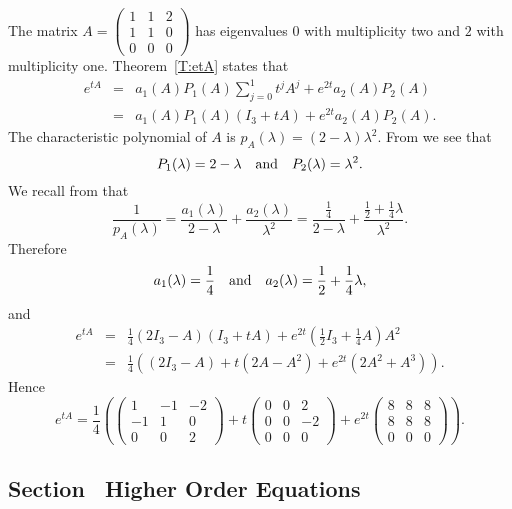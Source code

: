 \documentclass{ximera}
\begin{document}
\soln The matrix 
$A = \left(\begin{array}{rrr} 1 & 1 & 2\\ 1 & 1 & 0 \\ 0 & 0 & 0
\end{array}\right)$ has eigenvalues $0$ with multiplicity two and $2$ 
with multiplicity one. Theorem~\ref{T:etA} states that 
\begin{eqnarray*}
e^{tA} & = & a_1(A)P_1(A)\sum_{j=0}^1t^jA^j + e^{2t}a_2(A)P_2(A)\\
 & = & a_1(A)P_1(A)(I_3+tA) + e^{2t}a_2(A)P_2(A).
\end{eqnarray*}
The characteristic polynomial of $A$ is $p_A(\lambda) =(2-\lambda)\lambda^2$.
From  we see that
\[
P_1(\lambda) = 2-\lambda \quad\mbox{and}\quad P_2(\lambda) = \lambda^2.
\]
We recall from  that 
\[
\frac{1}{p_A(\lambda)} = \frac{a_1(\lambda)}{2-\lambda} + 
\frac{a_2(\lambda)}{\lambda^2} = \frac{\frac{1}{4}}{2-\lambda}
+ \frac{\frac{1}{2}+\frac{1}{4}\lambda}{\lambda^2}.
\]
Therefore
\[
a_1(\lambda) = \frac{1}{4} \quad\mbox{and}\quad a_2(\lambda) = \frac{1}{2}+\frac{1}{4}\lambda,
\]
and
\begin{eqnarray*}
e^{tA} & = & \frac{1}{4}(2I_3-A)(I_3+tA) + 
e^{2t}\left(\frac{1}{2}I_3+\frac{1}{4}A\right)A^2\\
& = & \frac{1}{4}\left((2I_3-A)+t(2A-A^2)+e^{2t}(2A^2+A^3)\right).
\end{eqnarray*}
Hence
\[
e^{tA}= \frac{1}{4}\left(\left(\begin{array}{rrr} 1 & -1 & -2\\ -1 & 1 & 0 
\\ 0 & 0 & 2\end{array}\right)+t\left(\begin{array}{rrr} 0 & 0 & 2\\ 0 & 0 & -2
\\ 0 & 0 & 0 \end{array}\right)+e^{2t}\left(\begin{array}{rrr} 8 & 8 & 8\\ 
8 & 8 & 8 \\ 0 & 0 & 0\end{array}\right)\right).
\]



\subsection*{Section~\protect{\ref{sec:HighOrder}} Higher Order Equations}
\end{document}

